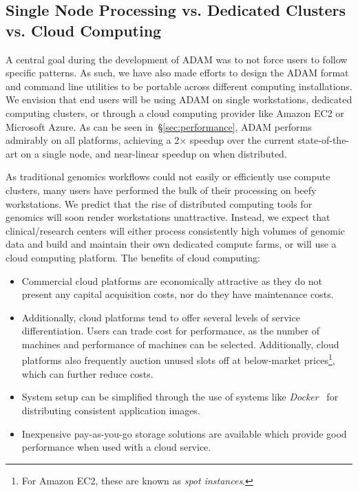 \documentclass{bioinfo}
\begin{document}
\subsection{Single Node Processing vs. Dedicated Clusters vs. Cloud Computing}
\label{sec:single-vs-clusters-vs-cloud}

A central goal during the development of ADAM was to not force users to follow specific patterns. As such, we have also made efforts to design the ADAM format and command
line utilities to be portable across different computing installations. We envision that end users will be using ADAM on single workstations, dedicated computing
clusters, or through a cloud computing provider like Amazon EC2 or Microsoft Azure. As can be seen in~\S\ref{sec:performance}, ADAM performs admirably on all platforms,
achieving a 2$\times$ speedup over the current state-of-the-art on a single node, and near-linear speedup on when distributed.

As traditional genomics workflows could not easily or efficiently use compute clusters, many users have performed the bulk of their processing on beefy workstations. We predict
that the rise of distributed computing tools for genomics will soon render workstations unattractive. Instead, we expect that clinical/research centers will either process
consistently high volumes of genomic data and build and maintain their own dedicated compute farms, or will use a cloud computing platform. The benefits of cloud computing:

\begin{itemize}
\item Commercial cloud platforms are economically attractive as they do not present any capital acquisition costs, nor do they have maintenance costs.
\item Additionally, cloud platforms tend to offer several levels of service differentiation. Users can trade cost for performance, as the number of machines and performance of
machines can be selected. Additionally, cloud platforms also frequently auction unused slots off at below-market prices\footnote{For Amazon EC2, these are known as
\emph{spot instances}.}, which can further reduce costs.
\item System setup can be simplified through the use of systems like \textit{Docker}~\citep{docker} for distributing consistent application images.
\item Inexpensive pay-as-you-go storage solutions are available which provide good performance when used with a cloud service.
\end{itemize}
\end{document}
